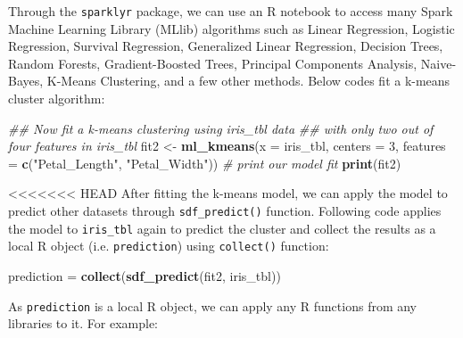 \documentclass[12pt,]{krantz}
\makeatletter
\newenvironment{Shaded}{\begin{snugshade}}{\end{snugshade}}
\newcommand{\CommentTok}[1]{\textcolor[rgb]{0.37,0.37,0.37}{\textit{#1}}}
\newcommand{\DataTypeTok}[1]{\textcolor[rgb]{0.27,0.27,0.27}{#1}}
\newcommand{\DecValTok}[1]{\textcolor[rgb]{0.06,0.06,0.06}{#1}}
\newcommand{\KeywordTok}[1]{\textcolor[rgb]{0.27,0.27,0.27}{\textbf{#1}}}
\newcommand{\NormalTok}[1]{#1}
\newcommand{\StringTok}[1]{\textcolor[rgb]{0.5,0.5,0.5}{#1}}
\newenvironment{kframe}{%
\medskip{}
\setlength{\fboxsep}{.8em}
 \def\at@end@of@kframe{}%
 \ifinner\ifhmode%
  \def\at@end@of@kframe{\end{minipage}}%
  \begin{minipage}{\columnwidth}%
 \fi\fi%
 \def\FrameCommand##1{\hskip\@totalleftmargin \hskip-\fboxsep
 \colorbox{shadecolor}{##1}\hskip-\fboxsep
     \hskip-\linewidth \hskip-\@totalleftmargin \hskip\columnwidth}%
 \MakeFramed {\advance\hsize-\width
   \@totalleftmargin\z@ \linewidth\hsize
   \@setminipage}}%
 {\par\unskip\endMakeFramed%
 \at@end@of@kframe}
\renewenvironment{Shaded}{\begin{kframe}}{\end{kframe}}
\makeatother
\begin{document}
Through the \texttt{sparklyr} package, we can use an R notebook to access many Spark Machine Learning Library (MLlib) algorithms such as Linear Regression, Logistic Regression, Survival Regression, Generalized Linear Regression, Decision Trees, Random Forests, Gradient-Boosted Trees, Principal Components Analysis, Naive-Bayes, K-Means Clustering, and a few other methods. Below codes fit a k-means cluster algorithm:

\begin{Shaded}
\begin{Highlighting}[]
\CommentTok{## Now fit a k-means clustering using iris_tbl data}
\CommentTok{## with only two out of four features in iris_tbl}
\NormalTok{fit2 <-}\StringTok{ }\KeywordTok{ml_kmeans}\NormalTok{(}\DataTypeTok{x =}\NormalTok{ iris_tbl, }\DataTypeTok{centers =} \DecValTok{3}\NormalTok{,}
                    \DataTypeTok{features =} \KeywordTok{c}\NormalTok{(}\StringTok{"Petal_Length"}\NormalTok{, }\StringTok{"Petal_Width"}\NormalTok{))}
\CommentTok{# print our model fit}
\KeywordTok{print}\NormalTok{(fit2)}
\end{Highlighting}
\end{Shaded}

\textless{}\textless{}\textless{}\textless{}\textless{}\textless{}\textless{} HEAD
After fitting the k-means model, we can apply the model to predict other datasets through \texttt{sdf\_predict()} function. Following code applies the model to \texttt{iris\_tbl} again to predict the cluster and collect the results as a local R object (i.e. \texttt{prediction}) using \texttt{collect()} function:

\begin{Shaded}
\begin{Highlighting}[]
\NormalTok{prediction =}\StringTok{ }\KeywordTok{collect}\NormalTok{(}\KeywordTok{sdf_predict}\NormalTok{(fit2, iris_tbl))}
\end{Highlighting}
\end{Shaded}

As \texttt{prediction} is a local R object, we can apply any R functions from any libraries to it. For example:
\end{document}
